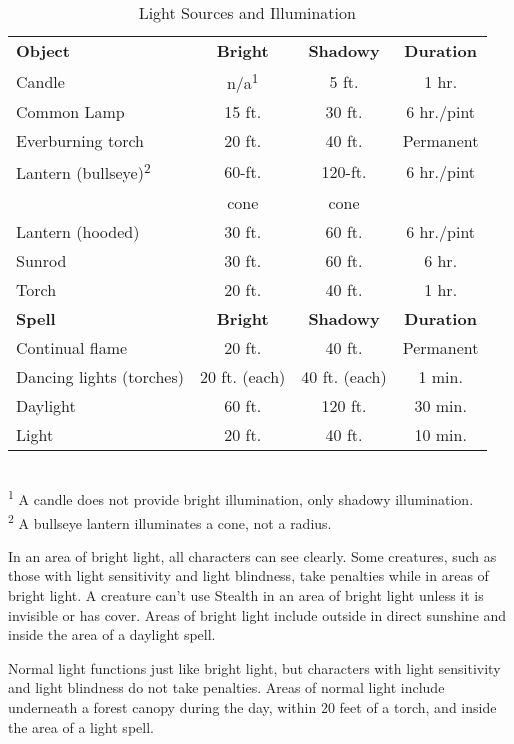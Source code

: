 \begin{table}[htb]
\sffamily
{}
\caption{Light Sources and Illumination}
\begin{tabular}{lccc}
\textbf{Object} & \textbf{Bright} & \textbf{Shadowy} & \textbf{Duration}\\
Candle & n/a\textsuperscript{1} & 5 ft. & 1 hr.\\
Common Lamp & 15 ft. & 30 ft. & 6 hr./pint\\
Everburning torch & 20 ft. & 40 ft. & Permanent\\
Lantern (bullseye)\textsuperscript{2} & 60-ft. & 120-ft. & 6 hr./pint\\
                                      & cone  & cone & \\
Lantern (hooded) & 30 ft. & 60 ft. & 6 hr./pint\\
Sunrod & 30 ft. & 60 ft. & 6 hr.\\
Torch & 20 ft. & 40 ft. & 1 hr.\\
\textbf{Spell} & \textbf{Bright} & \textbf{Shadowy} & \textbf{Duration}\\
Continual flame & 20 ft. & 40 ft. & Permanent\\
Dancing lights (torches) & 20 ft. (each) & 40 ft. (each) & 1 min.\\
Daylight & 60 ft. & 120 ft. & 30 min.\\
Light & 20 ft. & 40 ft. & 10 min.\\
\end{tabular}\\
\textsuperscript{1} A candle does not provide bright illumination, only shadowy illumination.\\
\textsuperscript{2} A bullseye lantern illuminates a cone, not a radius.\\
\end{table}


				
In an area of bright light, all characters can see clearly. Some creatures, such as those with light sensitivity and light blindness, take penalties while in areas of bright light. A creature can't use Stealth in an area of bright light unless it is invisible or has cover. Areas of bright light include outside in direct sunshine and inside the area of a daylight spell.
				
Normal light functions just like bright light, but characters with light sensitivity and light blindness do not take penalties. Areas of normal light include underneath a forest canopy during the day, within 20 feet of a torch, and inside the area of a light spell.
				
